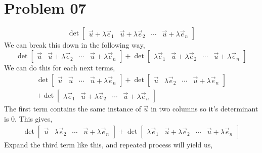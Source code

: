 \documentclass[letter]{article}
\begin{document}
\section*{Problem 07}
\[
\det 
\begin{bmatrix} 
	\vec{u}+\lambda \vec{e}_1 &
	\vec{u}+\lambda \vec{e}_2 & 
	\cdots &  
	\vec{u}+\lambda \vec{e}_n
\end{bmatrix} 
\]
We can break this down in the following way,
\[
\det 
\begin{bmatrix} 
	\vec{u} &
	\vec{u}+\lambda \vec{e}_2 & 
	\cdots &  
	\vec{u}+\lambda \vec{e}_n
\end{bmatrix}
+\det 
\begin{bmatrix} 
	\lambda \vec{e}_1 &
	\vec{u}+\lambda \vec{e}_2 & 
	\cdots &  
	\vec{u}+\lambda \vec{e}_n
\end{bmatrix}
\]
We can do this for each next terms, 
\begin{align*}
\det 
\begin{bmatrix} 
	\vec{u} &
	\vec{u} & 
	\cdots &  
	\vec{u}+\lambda \vec{e}_n
\end{bmatrix}+
\det 
\begin{bmatrix} 
	\vec{u} &
	\lambda\vec{e}_2 & 
	\cdots &  
	\vec{u}+\lambda \vec{e}_n
\end{bmatrix} \\
+\det 
\begin{bmatrix} 
	\lambda \vec{e}_1 &
	\vec{u}+\lambda \vec{e}_2 & 
	\cdots &  
	\vec{u}+\lambda \vec{e}_n
\end{bmatrix}
\end{align*}
The first term contains the same instance of $\vec{u}$ in two columns so it's determinant is $0$. This gives, 
\begin{align*}
\det 
\begin{bmatrix} 
	\vec{u} &
	\lambda\vec{e}_2 & 
	\cdots &  
	\vec{u}+\lambda \vec{e}_n
\end{bmatrix} 
+\det 
\begin{bmatrix} 
	\lambda \vec{e}_1 &
	\vec{u}+\lambda \vec{e}_2 & 
	\cdots &  
	\vec{u}+\lambda \vec{e}_n
\end{bmatrix}
\end{align*}
Expand the third term like this, and repeated process will yield us, 
\end{document}
